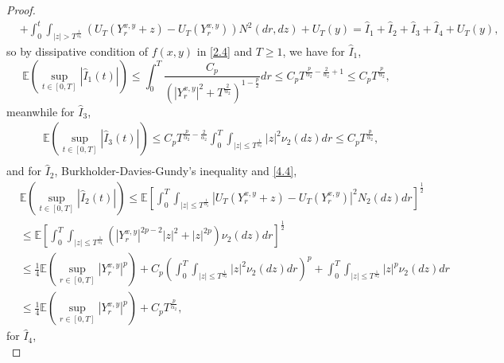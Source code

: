 \documentclass[11pt,reqno]{amsart}
\numberwithin{equation}{section}
\begin{document}
\begin{proof}
\begin{equation}
\begin{split}
			&+\int_{0}^{t} \int_{|z|> T^{\frac{1}{\alpha_{2}}}}\left( U_{T}(Y_{r}^{x,y}+z)-U_{T}(Y_{r}^{ x,y}) \right) N^{2}(dr,dz)+U_{T}(y)=\hat{I}_{1}+\hat{I}_{2}+\hat{I}_{3}+\hat{I}_{4}+U_{T}(y),
		\end{split}
	\end{equation}
	so by dissipative condition of $f(x,y)$ in  \eqref{2.4} and $T\geq 1$, we have for $\hat{I}_{1}$,
	\begin{equation}\label{4.9}
		\mathbb{E}\left(\sup_{t\in [0,T]} |\hat{I}_{1}(t)|\right)\leq \int_{0}^{T} \frac{C_{p}}{(|Y_{r}^{ x,y}|^{2}+T^{\frac{2}{\alpha_{2}}})^{1-\frac{p}{2}}}dr\leq C_{p}T^{\frac{p}{\alpha_{2}}-\frac{2}{\alpha_{2}}+1}\leq C_{p}T^{\frac{p}{\alpha_{2}}},
	\end{equation}
	meanwhile for $\hat{I}_{3}$,
	\begin{equation}\label{4.10}
		\begin{split}
			&\mathbb{E}\left(\sup_{t\in [0,T]} |\hat{I}_{3}(t)|\right)\leq C_{p}T^{\frac{p}{\alpha_{2}}-\frac{2}{\alpha_{2}}}\int_{0}^{T}\int_{|z|\leq T^{\frac{1}{\alpha_{2}}}}|z|^{2}\nu_{2}(dz)dr\leq C_{p}T^{\frac{p}{\alpha_{2}}},\\
		\end{split}
	\end{equation}
	and for $\hat{I}_{2}$, Burkholder-Davies-Gundy's inequality and \eqref{4.4},
	\begin{equation}\label{4.11}
		\begin{split}
			&\mathbb{E}\left(\sup_{t\in [0,T]} |\hat{I}_{2}(t)|\right)\leq \mathbb{E}\left[ \int_{0}^{T} \int_{|z|\leq T^{\frac{1}{\alpha_{2}}}}\left|  U_{T}(Y_{r}^{ x,y}+z)-U_{T}(Y_{r}^{ x,y}) \right|^{2}  N_{2}(dz)dr\right] ^{\frac{1}{2}}\\
			&\leq \mathbb{E}\left[ \int_{0}^{T} \int_{|z|\leq T^{\frac{1}{\alpha_{2}}}}\left( \left| Y_{r}^{ x,y}  \right|^{2p-2}|z|^{2}+|z|^{2p} \right)  \nu_{2}(dz)dr\right] ^{\frac{1}{2}}\\
			&\leq \frac{1}{4}\mathbb{E} \left(\sup_{r\in [0,T]} |Y_{r}^{ x,y}|^{p}\right)+C_{p}\left(\int_{0}^{T} \int_{|z|\leq T^{\frac{1}{\alpha_{2}}}} |z|^{2}  \nu_{2}(dz)dr\right) ^{p}+\int_{0}^{T} \int_{|z|\leq T^{\frac{1}{\alpha_{2}}}} |z|^{p}  \nu_{2}(dz)dr\\
			&\leq \frac{1}{4}\mathbb{E} \left(\sup_{r\in [0,T]} |Y_{r}^{ x,y}|^{p}\right)+C_{p}T^{\frac{p}{\alpha_{2}}},
		\end{split}
	\end{equation}
	for $\hat{I}_{4}$,
	\begin{equation}\label{4.11-1}

\end{equation}
\end{proof}
\end{document}
